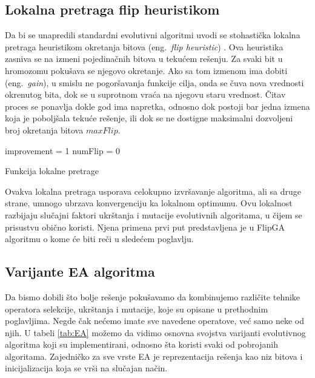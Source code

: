 \documentclass[a4paper]{article}
\begin{document}
\subsection{Lokalna pretraga flip heuristikom}
\label{sec:lokalna_pretraga_flip}
Da bi se unapredili standardni evolutivni algoritmi uvodi se stohastička lokalna pretraga
heuristikom okretanja bitova (eng.~{\em flip heuristic}) \cite{MaRos99_flipGA}.
Ova heuristika zasniva se na izmeni pojedinačnih bitova u tekućem rešenju. 
Za svaki bit u hromozomu pokušava se njegovo okretanje. Ako sa tom izmenom ima dobiti 
(eng.~{\em gain}), u smislu ne pogoršavanja funkcije cilja, 
onda se čuva nova vrednosti okrenutog bita, 
dok se u suprotnom vraća na njegovu staru vrednost. 
Čitav proces se ponavlja dokle god ima napretka, odnosno dok postoji bar jedna izmena
koja je poboljšala tekuće rešenje, ili dok se ne dostigne maksimalni dozvoljeni broj
okretanja bitova $maxFlip$.\\

\begin{algorithm}[H]
\SetAlgoLined
{}

\BlankLine
 improvement = 1\;
 numFlip = 0\;
 \caption{Funkcija lokalne pretrage}
\end{algorithm}

Ovakva lokalna pretraga usporava celokupno izvršavanje algoritma, ali sa druge strane, 
umnogo ubrzava konvergenciju ka lokalnom optimumu. Ovu lokalnost razbijaju slučajni faktori
ukrštanja i mutacije evolutivnih algoritama, u čijem se prisustvu obično koristi. 
Njena primena prvi put predstavljena je u FlipGA algoritmu o kome će biti reči 
u sledećem poglavlju.


\subsection{Varijante EA algoritma}
\label{sec:ea_varijante}
Da bismo dobili što bolje rešenje pokušavamo da kombinujemo različite tehnike 
operatora selekcije, ukrštanja i mutacije, koje su opisane u prethodnim poglavljima. 
Negde čak nećemo imate sve navedene operatove, već samo neke od njih. 
U tabeli \ref{tab:EA} možemo da vidimo osnovna svojstva varijanti evolutivnog algoritma 
koji su implementirani, odnosno šta koristi svaki od pobrojanih algoritama.
Zajedničko za sve vrste EA je reprezentacija rešenja kao niz bitova i
inicijalizacija koja se vrši na slučajan način.
 
\end{document}
